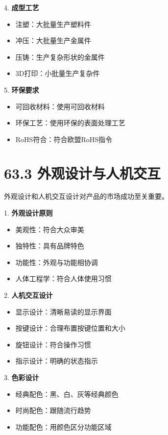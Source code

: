 \documentclass[12pt,UTF8]{ctexbook}
\begin{document}
4. \textbf{成型工艺}
   \begin{itemize}[leftmargin=3.5em]
   \item 注塑：大批量生产塑料件
   \item 冲压：大批量生产金属件
   \item 压铸：生产复杂形状的金属件
   \item 3D打印：小批量生产复杂件
   \end{itemize}

5. \textbf{环保要求}
   \begin{itemize}[leftmargin=3.5em]
   \item 可回收材料：使用可回收材料
   \item 环保工艺：使用环保的表面处理工艺
   \item RoHS符合：符合欧盟RoHS指令
   \end{itemize}

\section*{63.3 外观设计与人机交互}

外观设计和人机交互设计对产品的市场成功至关重要。

1. \textbf{外观设计原则}
   \begin{itemize}[leftmargin=3.5em]
   \item 美观性：符合大众审美
   \item 独特性：具有品牌特色
   \item 功能性：外观与功能相协调
   \item 人体工程学：符合人体使用习惯
   \end{itemize}

2. \textbf{人机交互设计}
   \begin{itemize}[leftmargin=3.5em]
   \item 显示设计：清晰易读的显示界面
   \item 按键设计：合理布置按键位置和大小
   \item 旋钮设计：符合操作习惯
   \item 指示设计：明确的状态指示
   \end{itemize}

3. \textbf{色彩设计}
   \begin{itemize}[leftmargin=3.5em]
   \item 经典配色：黑、白、灰等经典颜色
   \item 时尚配色：跟随流行趋势
   \item 功能配色：用颜色区分功能区域
   \end{itemize}
\end{document}
